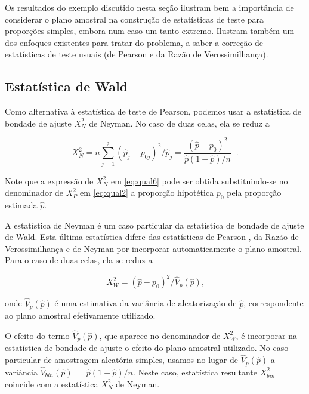 \documentclass[]{book}
\numberwithin{example}{chapter}
\numberwithin{remark}{chapter}
\numberwithin{definition}{chapter}
\begin{document}
Os resultados do exemplo discutido nesta seção ilustram bem a
importância de considerar o plano amostral na construção de estatísticas
de teste para proporções simples, embora num caso um tanto extremo.
Ilustram também um dos enfoques existentes para tratar do problema, a
saber a correção de estatísticas de teste usuais (de Pearson e da Razão
de Verossimilhança).

\subsection{Estatística de Wald}\label{estatistica-de-wald}

Como alternativa à estatística de teste de Pearson, podemos usar a
estatística de bondade de ajuste \(X_{N}^{2}\) de Neyman. No caso de
duas celas, ela se reduz a

\begin{equation}
X_{N}^{2}=n\sum\limits_{j=1}^{2}\left( \hat{p}_{j}-p_{0j}\right) ^{2}/\hat{p}%
_{j}=\frac{\left( \widehat{p}-p_{0}\right) ^{2}}{\hat{p}\left( 1-\hat{p}
\right) /n}\;\;\mbox{.}  
\label{eq:qual6}
\end{equation}

Note que a expressão de \(X_{N}^{2}\) em \eqref{eq:qual6} pode ser obtida
substituindo-se no denominador de \(X_{P}^{2}\) em \eqref{eq:qual2} a
proporção hipotética \(p_{0}\) pela proporção estimada \(\hat{p}\).

A estatística de Neyman é um caso particular da estatística de bondade
de ajuste de Wald. Esta última estatística difere das estatísticas de
Pearson , da Razão de Verossimilhança e de Neyman por incorporar
automaticamente o plano amostral. Para o caso de duas celas, ela se
reduz a

\begin{equation}
X_{W}^{2}=\left( \widehat{p}-p_{0}\right) ^{2}/\hat{V}_{p}\left( \widehat{p}
\right) \mbox{,}  
\label{eq:qual7}
\end{equation}

onde \(\hat{V}_{p}\left( \widehat{p}\right)\) é uma estimativa da
variância de aleatorização de \(\hat{p}\), correspondente ao plano
amostral efetivamente utilizado.

O efeito do termo \(\hat{V}_{p}\left( \widehat{p}\right)\), que aparece
no denominador de \(X_{W}^{2}\), é incorporar na estatística de bondade
de ajuste o efeito do plano amostral utilizado. No caso particular de
amostragem aleatória simples, usamos no lugar de
\(\widehat{V}_{p}\left( \widehat{p}\right)\) a variância
\(\widehat{V}_{bin}\left( \widehat{p}\right) =\)
\(\widehat{p}\left( 1-\widehat{p}\right) /n\). Neste caso, estatística
resultante \(X_{bin}^{2}\) coincide com a estatística \(X_{N}^{2}\) de
Neyman.
\end{document}
